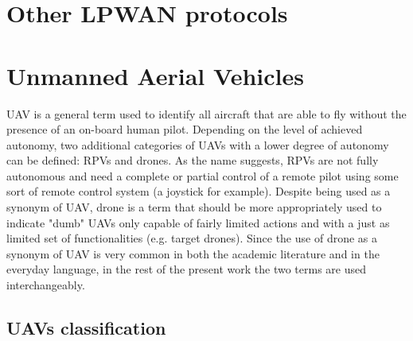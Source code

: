 \section{Other LPWAN protocols}

\section{Unmanned Aerial Vehicles}

\gls{UAV} is a general term used to identify all aircraft that are able to fly without the presence of an on-board human pilot. Depending on the level of achieved autonomy, two additional categories of \glspl{UAV} with a lower degree of autonomy can be defined: \glspl{RPV} and drones. As the name suggests, \glspl{RPV} are not fully autonomous and need a complete or partial control of a remote pilot using some sort of remote control system (a joystick for example). Despite being used as a synonym of \gls{UAV}, drone is a term that should be more appropriately used to indicate "dumb" \glspl{UAV} only capable of fairly limited actions and with a just as limited set of functionalities (e.g. target drones). Since the use of drone as a synonym of \gls{UAV} is very common in both the academic literature and in the everyday language, in the rest of the present work the two terms are used interchangeably. 

\subsection{\glspl{UAV} classification}

